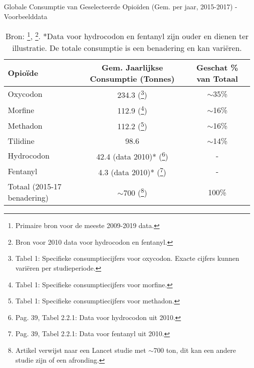 \documentclass[11pt, a4paper]{report} %
\begin{document}
\begin{table}[htbp]
    \centering
    \caption{Globale Consumptie van Geselecteerde Opioïden (Gem. per jaar, 2015-2017) - Voorbeelddata}
    \label{tab:global_consumption_future} %
    \begin{tabular}{l c c}
        \toprule
        Opioïde      & Gem. Jaarlijkse Consumptie (Tonnes) & Geschat \% van Totaal \\
        \midrule
        Oxycodon     & 234.3  (\cite{Berterame2021GlobalConsumptionPresc}\footnote{Tabel 1: Specifieke consumptiecijfers voor oxycodon. Exacte cijfers kunnen variëren per studieperiode.})                             & $\sim$35\%                 \\
        Morfine      & 112.9  (\cite{Berterame2021GlobalConsumptionPresc}\footnote{Tabel 1: Specifieke consumptiecijfers voor morfine.})                             & $\sim$16\%                 \\
        Methadon     & 112.2  (\cite{Berterame2021GlobalConsumptionPresc}\footnote{Tabel 1: Specifieke consumptiecijfers voor methadon.})                             & $\sim$16\%                 \\
        Tilidine     & 98.6                                & $\sim$14\%                 \\ %
        Hydrocodon   & 42.4 (data 2010)* (\cite{UNODC2010WDR}\footnote{Pag. 39, Tabel 2.2.1: Data voor hydrocodon uit 2010.})                   & -                     \\
        Fentanyl     & 4.3 (data 2010)* (\cite{UNODC2010WDR}\footnote{Pag. 39, Tabel 2.2.1: Data voor fentanyl uit 2010.})                    & -                     \\
        \midrule
        Totaal (2015-17 benadering) & $\sim$700 (\cite{PMCID8801686GlobalConsumption}\footnote{Artikel verwijst naar een Lancet studie met $\sim$700 ton, dit kan een andere studie zijn of een afronding.})                           & 100\%                 \\
        \bottomrule
    \end{tabular}
    \caption*{\footnotesize Bron: \parencite{Berterame2021GlobalConsumptionPresc}\footnote{Primaire bron voor de meeste 2009-2019 data.}, \parencite{UNODC2010WDR}\footnote{Bron voor 2010 data voor hydrocodon en fentanyl.}. *Data voor hydrocodon en fentanyl zijn ouder en dienen ter illustratie. De totale consumptie is een benadering en kan variëren.}
\end{table}
\end{document}
